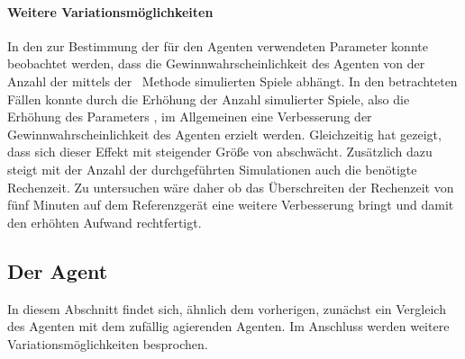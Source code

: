 \paragraph{Weitere Variationsmöglichkeiten}
In den zur Bestimmung der für den Agenten verwendeten Parameter konnte beobachtet werden, dass die Gewinnwahrscheinlichkeit des Agenten von der Anzahl der mittels der \mc\ Methode simulierten Spiele abhängt. In den betrachteten Fällen konnte durch die Erhöhung der Anzahl simulierter Spiele, also die Erhöhung des Parameters , im Allgemeinen eine Verbesserung der Gewinnwahrscheinlichkeit des Agenten erzielt werden. Gleichzeitig hat \cite{nijssen_2007} gezeigt, dass sich dieser Effekt mit steigender Größe von  abschwächt. Zusätzlich dazu steigt mit der Anzahl der durchgeführten Simulationen auch die benötigte Rechenzeit. Zu untersuchen wäre daher ob das Überschreiten der Rechenzeit von fünf Minuten auf dem Referenzgerät eine weitere Verbesserung bringt und damit den erhöhten Aufwand rechtfertigt.

\subsection{Der Agent \mxZitat{\abp}}
\authorpatrick
In diesem Abschnitt findet sich, ähnlich dem vorherigen, zunächst ein Vergleich des \mxZitat{\abp} Agenten mit dem zufällig agierenden Agenten. Im Anschluss werden weitere Variationsmöglichkeiten besprochen. 
